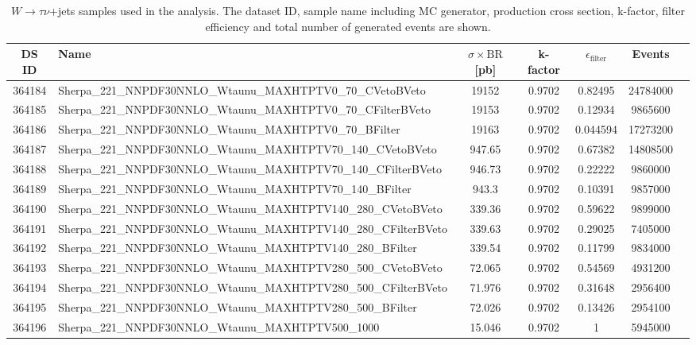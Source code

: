 \begin{landscape}
\begin{table}[!htb]
\caption[$W\to\tau\nu+$ jets Monte Carlo samples for background estimation]{$W \to \tau\nu$+jets samples used in the analysis. The dataset ID, sample name including MC generator, production cross section, k-factor, filter efficiency and total number of generated events are shown.}
\label{tabular:mc_samples_Wtaunujets}
\begin{footnotesize}
\begin{center}
\begin{tabular}{c|l|c|c|c|cr}
	\hline\hline
	DS ID & Name & $\sigma\times\text{BR}$ [pb] & k-factor & $\epsilon_{\text{filter}}$ & Events \\ \hline\hline
364184 & Sherpa\_221\_NNPDF30NNLO\_Wtaunu\_MAXHTPTV0\_70\_CVetoBVeto & 19152 & 0.9702 & 0.82495 & 24784000 \\
364185 & Sherpa\_221\_NNPDF30NNLO\_Wtaunu\_MAXHTPTV0\_70\_CFilterBVeto & 19153 & 0.9702 & 0.12934 & 9865600 \\
364186 & Sherpa\_221\_NNPDF30NNLO\_Wtaunu\_MAXHTPTV0\_70\_BFilter & 19163 & 0.9702 & 0.044594 & 17273200 \\
364187 & Sherpa\_221\_NNPDF30NNLO\_Wtaunu\_MAXHTPTV70\_140\_CVetoBVeto & 947.65 & 0.9702 & 0.67382 & 14808500 \\
364188 & Sherpa\_221\_NNPDF30NNLO\_Wtaunu\_MAXHTPTV70\_140\_CFilterBVeto & 946.73 & 0.9702 & 0.22222 & 9860000 \\
364189 & Sherpa\_221\_NNPDF30NNLO\_Wtaunu\_MAXHTPTV70\_140\_BFilter & 943.3 & 0.9702 & 0.10391 & 9857000 \\
364190 & Sherpa\_221\_NNPDF30NNLO\_Wtaunu\_MAXHTPTV140\_280\_CVetoBVeto & 339.36 & 0.9702 & 0.59622 & 9899000 \\
364191 & Sherpa\_221\_NNPDF30NNLO\_Wtaunu\_MAXHTPTV140\_280\_CFilterBVeto & 339.63 & 0.9702 & 0.29025 & 7405000 \\
364192 & Sherpa\_221\_NNPDF30NNLO\_Wtaunu\_MAXHTPTV140\_280\_BFilter & 339.54 & 0.9702 & 0.11799 & 9834000 \\
364193 & Sherpa\_221\_NNPDF30NNLO\_Wtaunu\_MAXHTPTV280\_500\_CVetoBVeto & 72.065 & 0.9702 & 0.54569 & 4931200 \\
364194 & Sherpa\_221\_NNPDF30NNLO\_Wtaunu\_MAXHTPTV280\_500\_CFilterBVeto & 71.976 & 0.9702 & 0.31648 & 2956400 \\
364195 & Sherpa\_221\_NNPDF30NNLO\_Wtaunu\_MAXHTPTV280\_500\_BFilter & 72.026 & 0.9702 & 0.13426 & 2954100 \\
364196 & Sherpa\_221\_NNPDF30NNLO\_Wtaunu\_MAXHTPTV500\_1000 & 15.046 & 0.9702 & 1 & 5945000 \\
	\hline\hline
\end{tabular}
\end{center}
\end{footnotesize}
\end{table}


\end{landscape}
